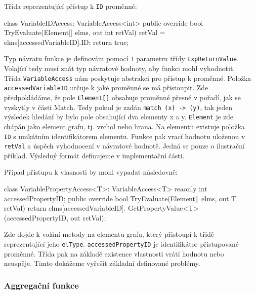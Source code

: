 Třída reprezentující přístup k \verb+ID+ proměnné:
\begin{code}
class VariableIDAccess: VariableAccess<int> {
  public override bool TryEvaluate(Element[] elms, out int retVal) {
     retVal = elms[accessedVariableID].ID;
     return true; } }
\end{code}
Typ návratu funkce je definovám pomocí \texttt{T} parametru třídy \texttt{ExpReturnValue}.
Volající tedy musí znát typ návratové hodnoty, aby funkci mohl vyhodnotit.
Třída \verb+VariableAccess+ nám poskytuje abstrakci pro přístup k proměnné.
Položka \verb+accessedVariableID+ určuje k jaké proměnné se má přistoupit.
Zde předpokládáme, že pole \verb+Element[]+ obsahuje proměnné přesně v pořadí, jak se vyskytly v části Match.
Tedy pokud je zadán \texttt{match (x) -> (y)}, tak jeden výsledek hledání by bylo pole obsahující dva elementy x a y.
\texttt{Element} je zde chápán jako element grafu, tj. vrchol nebo hrana.
Na elementu existuje položka \texttt{ID} s unikátním identifikátorem elementu.
Funkce pak vrací hodnotu uloženou v \texttt{retVal} a úspěch vyhodnocení v návratové hodnotě. 
Jedná se pouze o ilustrační příklad. 
Výsledný formát definujeme v implementační části.

Případ přístupu k vlasnosti by mohl vypadat následovně:
\begin{code}
class VariablePropertyAccess<T>: VariableAccess<T> {
  reaonly int accessedPropertyID; 
  public override bool TryEvaluate(Element[] elms, out T retVal) {
    return elms[accessedVariableID].
               GetPropertyValue<T>(accessedPropertyID, out retVal);
  }
}
\end{code}
Zde dojde k volání metody na elementu grafu, který přistoupí k třidě reprezentující jeho \verb+elType+.
\texttt{accessedPropertyID} je identifikátor přistupované proměnné.
Třída pak na základě existence vlastnosti vrátí hodnotu nebo neuspěje.
Timto dokážeme vyřešit základní definované problémy.

\subsubsection{Aggregační funkce}


